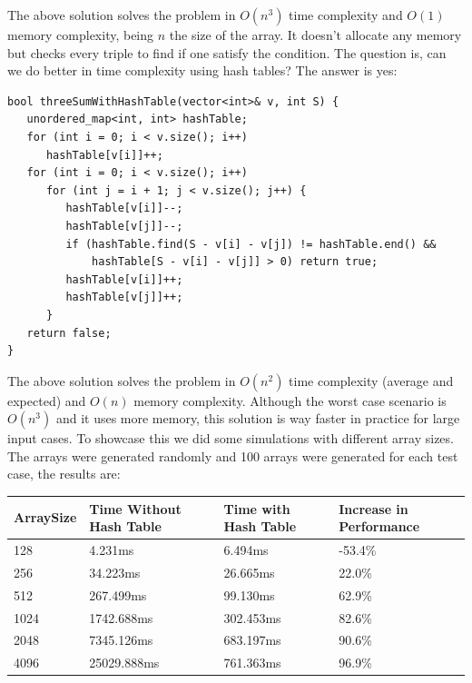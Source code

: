 \medskip

The above solution solves the problem in \( O(n^3) \) time complexity and \( O(1) \) memory complexity, being \( n \) the size of the array. It doesn't allocate any memory but checks every triple to find if one satisfy the condition. The question is, can we do better in time complexity using hash tables? The answer is yes:

\medskip

\begin{lstlisting}
bool threeSumWithHashTable(vector<int>& v, int S) {
   unordered_map<int, int> hashTable; 
   for (int i = 0; i < v.size(); i++)
      hashTable[v[i]]++;
   for (int i = 0; i < v.size(); i++)
      for (int j = i + 1; j < v.size(); j++) {
         hashTable[v[i]]--;
         hashTable[v[j]]--;         
         if (hashTable.find(S - v[i] - v[j]) != hashTable.end() &&
             hashTable[S - v[i] - v[j]] > 0) return true;
         hashTable[v[i]]++;
         hashTable[v[j]]++;
      }
   return false;
}
\end{lstlisting}

\medskip

The above solution solves the problem in \( O(n^2) \) time complexity (average and expected) and \( O(n) \) memory complexity. Although the worst case scenario is \( O(n^3) \) and it uses more memory, this solution is way faster in practice for large input cases. To showcase this we did some simulations with different array sizes. The arrays were generated randomly and 100 arrays were generated for each test case, the results are: \\

\bigskip

\begin{tabular}{|l|l|l|l|}
  \hline
  ArraySize & Time Without Hash Table & Time with Hash Table & Increase in Performance \\
  \hline
  128       & 4.231ms                 & 6.494ms              & -53.4\%                  \\
  \hline
  256       & 34.223ms                & 26.665ms             & 22.0\%                   \\
  \hline
  512       & 267.499ms               & 99.130ms             & 62.9\%                   \\
  \hline
  1024      & 1742.688ms              & 302.453ms            & 82.6\%                   \\
  \hline
  2048      & 7345.126ms              & 683.197ms            & 90.6\%                   \\
  \hline
  4096      & 25029.888ms             & 761.363ms            & 96.9\%                   \\
  \hline
\end{tabular}

